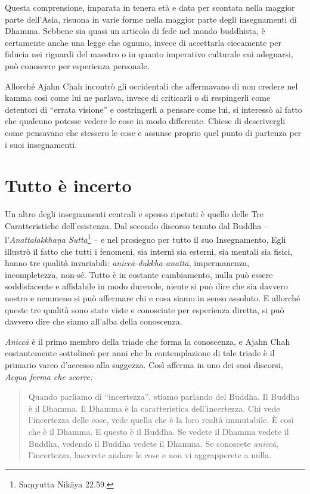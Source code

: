 Questa comprensione, imparata in tenera età e data per scontata nella
maggior parte dell'Asia, risuona in varie forme nella maggior parte
degli insegnamenti di Dhamma. Sebbene sia quasi un articolo di fede nel
mondo buddhista, è certamente anche una legge che ognuno, invece di
accettarla ciecamente per fiducia nei riguardi del maestro o in quanto
imperativo culturale cui adeguarsi, può conoscere per esperienza
personale.

Allorché Ajahn Chah incontrò gli occidentali che affermavano di non
credere nel kamma così come lui ne parlava, invece di criticarli
o di respingerli come detentori di ``errata visione'' e costringerli a
pensare come lui, si interessò al fatto che qualcuno potesse vedere le
cose in modo differente. Chiese di descrivergli come pensavano che
stessero le cose e assunse proprio quel punto di partenza per i suoi
insegnamenti.

\section{Tutto è incerto}

Un altro degli insegnamenti centrali e spesso ripetuti è quello delle
Tre Caratteristiche dell'esistenza. Dal secondo discorso tenuto dal
Buddha -- l'\emph{Anattalakkhaṇa Sutta}\footnote{Saṃyutta Nikāya
  22.59.} -- e nel prosieguo per tutto il suo Insegnamento, Egli
illustrò il fatto che tutti i fenomeni, sia interni sia esterni, sia
mentali sia fisici, hanno tre qualità invariabili:
\emph{aniccā-dukkha-anattā}, impermanenza, incompletezza, non-sé. Tutto
è in costante cambiamento, nulla può essere soddisfacente e affidabile
in modo durevole, niente si può dire che sia davvero nostro e nemmeno si
può affermare chi e cosa siamo in senso assoluto. E allorché queste tre
qualità sono state viste e conosciute per esperienza diretta, si può
davvero dire che siamo all'alba della conoscenza.

\emph{Aniccā} è il primo membro della triade che forma la conoscenza, e
Ajahn Chah costantemente sottolineò per anni che la contemplazione di
tale triade è il primario varco d'accesso alla saggezza. Così afferma in
uno dei suoi discorsi, \emph{Acqua ferma che scorre:}

\begin{quote}
Quando parliamo di ``incertezza'', stiamo parlando del Buddha. Il Buddha
è il Dhamma. Il Dhamma è la caratteristica dell'incertezza. Chi vede
l'incertezza delle cose, vede quella che è la loro realtà immutabile. È
così che è il Dhamma. E questo è il Buddha. Se vedete il Dhamma vedete
il Buddha, vedendo il Buddha vedete il Dhamma. Se conoscete
\emph{aniccā}, l'incertezza, lascerete andare le cose e non vi
aggrapperete a nulla.
\end{quote}

